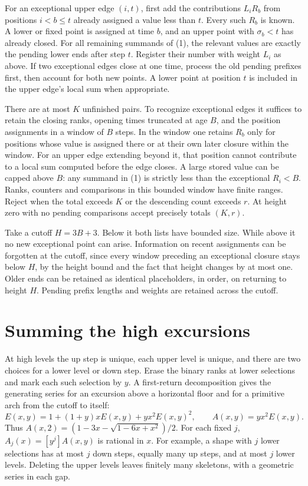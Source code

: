 \documentclass[11pt,letterpaper]{article}
\begin{document}
For an exceptional upper edge $(i,t)$, first add the contributions $L_iR_b$ from positions $i<b\le t$ already assigned a value less than $t$. Every such $R_b$ is known. A lower or fixed point is assigned at time $b$, and an upper point with $\sigma_b<t$ has already closed. For all remaining summands of (1), the relevant values are exactly the pending lower ends after step $t$. Register their number with weight $L_i$ as above. If two exceptional edges close at one time, process the old pending prefixes first, then account for both new points. A lower point at position $t$ is included in the upper edge's local sum when appropriate.

There are at most $K$ unfinished pairs. To recognize exceptional edges it suffices to retain the closing ranks, opening times truncated at age $B$, and the position assignments in a window of $B$ steps. In the window one retains $R_b$ only for positions whose value is assigned there or at their own later closure within the window. For an upper edge extending beyond it, that position cannot contribute to a local sum computed before the edge closes. A large stored value can be capped above $B$: any summand in (1) is strictly less than the exceptional $R_i<B$. Ranks, counters and comparisons in this bounded window have finite ranges. Reject when the total exceeds $K$ or the descending count exceeds $r$. At height zero with no pending comparisons accept precisely totals $(K,r)$.

Take a cutoff $H=3B+3$. Below it both lists have bounded size. While above it no new exceptional point can arise. Information on recent assignments can be forgotten at the cutoff, since every window preceding an exceptional closure stays below $H$, by the height bound and the fact that height changes by at most one. Older ends can be retained as identical placeholders, in order, on returning to height $H$. Pending prefix lengths and weights are retained across the cutoff.

\section{Summing the high excursions}
At high levels the up step is unique, each upper level is unique, and there are two choices for a lower level or down step. Erase the binary ranks at lower selections and mark each such selection by $y$. A first-return decomposition gives the generating series for an excursion above a horizontal floor and for a primitive arch from the cutoff to itself:
\[
 E(x,y)=1+(1+y)xE(x,y)+yx^2 E(x,y)^2,\qquad A(x,y)=yx^2E(x,y).
\]
Thus $A(x,2)=(1-3x-\sqrt{1-6x+x^2})/2$. For each fixed $j$, $A_j(x)=[y^j]A(x,y)$ is rational in $x$. For example, a shape with $j$ lower selections has at most $j$ down steps, equally many up steps, and at most $j$ lower levels. Deleting the upper levels leaves finitely many skeletons, with a geometric series in each gap.
\end{document}
